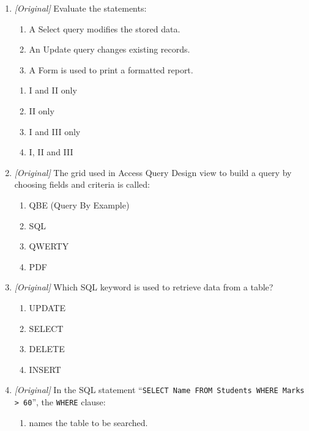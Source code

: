 \begin{enumerate}[label=\textbf{Q\arabic*.}, leftmargin=*]
  an MS Access database?
  \begin{enumerate}[label=\Alph*.]
    \item Table
    \item Query
    \item Report
    \item Spreadsheet
  \end{enumerate}
\item \textit{[Original]} Evaluate the statements:
  \begin{enumerate}[label=\Roman*.]
    \item A Select query modifies the stored data.
    \item An Update query changes existing records.
    \item A Form is used to print a formatted report.
  \end{enumerate}
  \begin{enumerate}[label=\Alph*.]
    \item I and II only
    \item II only
    \item I and III only
    \item I, II and III
  \end{enumerate}
\item \textit{[Original]} The grid used in Access Query Design view to build
  a query by choosing fields and criteria is called:
  \begin{enumerate}[label=\Alph*.]
    \item QBE (Query By Example)
    \item SQL
    \item QWERTY
    \item PDF
  \end{enumerate}
\item \textit{[Original]} Which SQL keyword is used to retrieve data from a
  table?
  \begin{enumerate}[label=\Alph*.]
    \item UPDATE
    \item SELECT
    \item DELETE
    \item INSERT
  \end{enumerate}
\item \textit{[Original]} In the SQL statement
  ``\texttt{SELECT Name FROM Students WHERE Marks > 60}'', the
  \texttt{WHERE} clause:
  \begin{enumerate}[label=\Alph*.]
    \item names the table to be searched.

\end{enumerate}
\end{enumerate}
